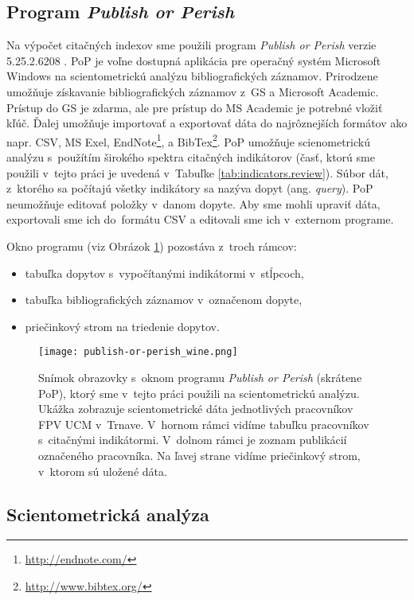 \subsection{Program \emph{Publish or Perish}}
\label{sec:pop}

Na výpočet citačných indexov sme použili program \emph{Publish or Perish} verzie
5.25.2.6208 \citep{Harzing2011}.  PoP je voľne dostupná aplikácia pre operačný
systém Microsoft Windows na scientometrickú analýzu bibliografických záznamov.
Prirodzene umožňuje získavanie bibliografických záznamov z~GS a Microsoft
Academic. Prístup do GS je zdarma, ale pre prístup do MS Academic je potrebné
vložiť kľúč.  Ďalej umožňuje importovať a exportovať dáta do najrôznejších
formátov ako napr.  CSV, MS Exel, EndNote\footnote{\url{http://endnote.com/}}, a
BibTex\footnote{\url{http://www.bibtex.org/}}.  PoP umožňuje scienometrickú
analýzu s~použítím širokého spektra citačných indikátorov (časť, ktorú sme
použili v~tejto práci je uvedená v~Tabuľke \ref{tab:indicators.review}).  Súbor
dát, z~ktorého sa počítajú všetky indikátory sa nazýva dopyt
(ang. \emph{query}).  PoP neumožňuje editovať položky v~danom dopyte. Aby sme
mohli upraviť dáta, exportovali sme ich do~formátu CSV a editovali sme ich
v~externom programe.

Okno programu (viz Obrázok \ref{fig:pop.screenshot}) pozostáva z~troch rámcov:
\begin{itemize}
\item tabuľka dopytov s~vypočítanými indikátormi v~stĺpcoch,
\item tabuľka bibliografických záznamov v~označenom dopyte,
\item priečinkový strom na triedenie dopytov.
\end{itemize}

\begin{figure}
  \centering
  \texttt{[image: publish-or-perish\_wine.png]}
  \caption[Snímok obrazovky s~oknom programu \emph{Publish or Perish}.]%
  {Snímok obrazovky s~oknom programu \emph{Publish or Perish} (skrátene PoP),
    ktorý sme v~tejto práci použili na scientometrickú analýzu.  Ukážka
    zobrazuje scientometrické dáta jednotlivých pracovníkov FPV UCM
    v~Trnave. V~hornom rámci vidíme tabuľku pracovníkov s~citačnými
    indikátormi. V~dolnom rámci je zoznam publikácií označeného pracovníka. Na
    ľavej strane vidíme priečinkový strom, v~ktorom sú uložené dáta.}
  \label{fig:pop.screenshot}
\end{figure}


\subsection{Scientometrická analýza}

